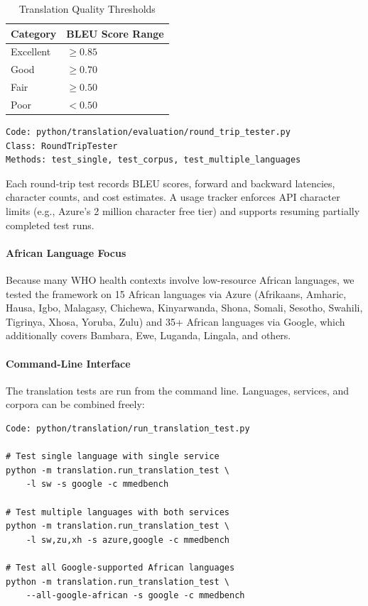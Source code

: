 \begin{table}[H]
\centering
\caption{Translation Quality Thresholds}
\label{tab:translation_quality}
\begin{tabular}{|l|l|}
\hline
\textbf{Category} & \textbf{BLEU Score Range} \\ \hline
Excellent & $\geq 0.85$ \\ \hline
Good & $\geq 0.70$ \\ \hline
Fair & $\geq 0.50$ \\ \hline
Poor & $< 0.50$ \\ \hline
\end{tabular}
\end{table}

\begin{verbatim}
Code: python/translation/evaluation/round_trip_tester.py
Class: RoundTripTester
Methods: test_single, test_corpus, test_multiple_languages
\end{verbatim}

Each round-trip test records BLEU scores, forward and backward latencies, character counts, and cost estimates. A usage tracker enforces API character limits (e.g., Azure's 2 million character free tier) and supports resuming partially completed test runs.

\paragraph{African Language Focus}
Because many WHO health contexts involve low-resource African languages, we tested the framework on 15 African languages via Azure (Afrikaans, Amharic, Hausa, Igbo, Malagasy, Chichewa, Kinyarwanda, Shona, Somali, Sesotho, Swahili, Tigrinya, Xhosa, Yoruba, Zulu) and 35+ African languages via Google, which additionally covers Bambara, Ewe, Luganda, Lingala, and others.

\paragraph{Command-Line Interface}
The translation tests are run from the command line. Languages, services, and corpora can be combined freely:
\begin{verbatim}
Code: python/translation/run_translation_test.py

# Test single language with single service
python -m translation.run_translation_test \
    -l sw -s google -c mmedbench

# Test multiple languages with both services
python -m translation.run_translation_test \
    -l sw,zu,xh -s azure,google -c mmedbench

# Test all Google-supported African languages
python -m translation.run_translation_test \
    --all-google-african -s google -c mmedbench
\end{verbatim}
